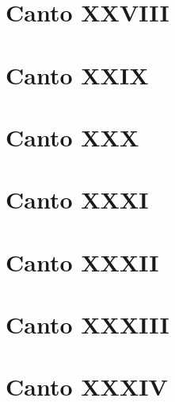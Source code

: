\documentclass[12pt]{book}
\begin{document}
\chapter{Canto XXVIII}
\chapter{Canto XXIX}
\chapter{Canto XXX}
\chapter{Canto XXXI}
\chapter{Canto XXXII}
\chapter{Canto XXXIII}
\chapter{Canto XXXIV}
\end{document}
